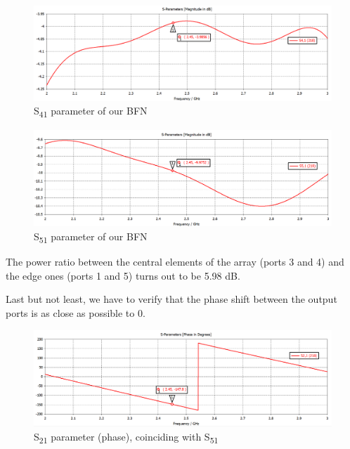 \begin{figure}[H]
\centering
\includegraphics[scale=0.35]{S41Amp.png}
\caption{S\textsubscript{41} parameter of our BFN}
\label{S41Amp}
\end{figure}

\begin{figure}[H]
\centering
\includegraphics[scale=0.35]{S51Amp.png}
\caption{S\textsubscript{51} parameter of our BFN}
\label{S51Amp}
\end{figure}

\par\medskip
\noindent
The power ratio between the central elements of the array (ports 3 and 4) and the edge ones (ports 1 and 5) turns out to be 5.98 dB.

\par\medskip
\noindent
Last but not least, we have to verify that the phase shift between the output ports is as close as possible to 0.

\begin{figure}[H]
\centering
\includegraphics[scale=0.35]{S21p.png}
\caption{S\textsubscript{21} parameter (phase), coinciding with S\textsubscript{51}}
\label{S21phase}
\end{figure}

